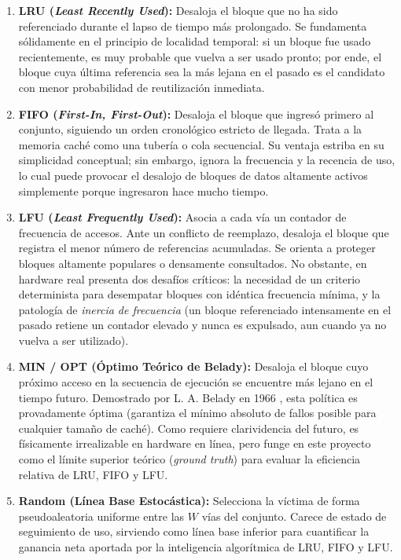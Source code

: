 \documentclass[11pt,letterpaper]{article}
\begin{document}
\begin{enumerate}
    \item \textbf{LRU (\textit{Least Recently Used}):} Desaloja el bloque que no ha sido referenciado durante el lapso de tiempo más prolongado. Se fundamenta sólidamente en el principio de localidad temporal: si un bloque fue usado recientemente, es muy probable que vuelva a ser usado pronto; por ende, el bloque cuya última referencia sea la más lejana en el pasado es el candidato con menor probabilidad de reutilización inmediata.
    \item \textbf{FIFO (\textit{First-In, First-Out}):} Desaloja el bloque que ingresó primero al conjunto, siguiendo un orden cronológico estricto de llegada. Trata a la memoria caché como una tubería o cola secuencial. Su ventaja estriba en su simplicidad conceptual; sin embargo, ignora la frecuencia y la recencia de uso, lo cual puede provocar el desalojo de bloques de datos altamente activos simplemente porque ingresaron hace mucho tiempo.
    \item \textbf{LFU (\textit{Least Frequently Used}):} Asocia a cada vía un contador de frecuencia de accesos. Ante un conflicto de reemplazo, desaloja el bloque que registra el menor número de referencias acumuladas. Se orienta a proteger bloques altamente populares o densamente consultados. No obstante, en hardware real presenta dos desafíos críticos: la necesidad de un criterio determinista para desempatar bloques con idéntica frecuencia mínima, y la patología de \textit{inercia de frecuencia} (un bloque referenciado intensamente en el pasado retiene un contador elevado y nunca es expulsado, aun cuando ya no vuelva a ser utilizado).
    \item \textbf{MIN / OPT (Óptimo Teórico de Belady):} Desaloja el bloque cuyo próximo acceso en la secuencia de ejecución se encuentre más lejano en el tiempo futuro. Demostrado por L. A. Belady en 1966 \cite{belady1966study}, esta política es provadamente óptima (garantiza el mínimo absoluto de fallos posible para cualquier tamaño de caché). Como requiere clarividencia del futuro, es físicamente irrealizable en hardware en línea, pero funge en este proyecto como el límite superior teórico (\textit{ground truth}) para evaluar la eficiencia relativa de LRU, FIFO y LFU.
    \item \textbf{Random (Línea Base Estocástica):} Selecciona la víctima de forma pseudoaleatoria uniforme entre las $W$ vías del conjunto. Carece de estado de seguimiento de uso, sirviendo como línea base inferior para cuantificar la ganancia neta aportada por la inteligencia algorítmica de LRU, FIFO y LFU.
\end{enumerate}
\end{document}
